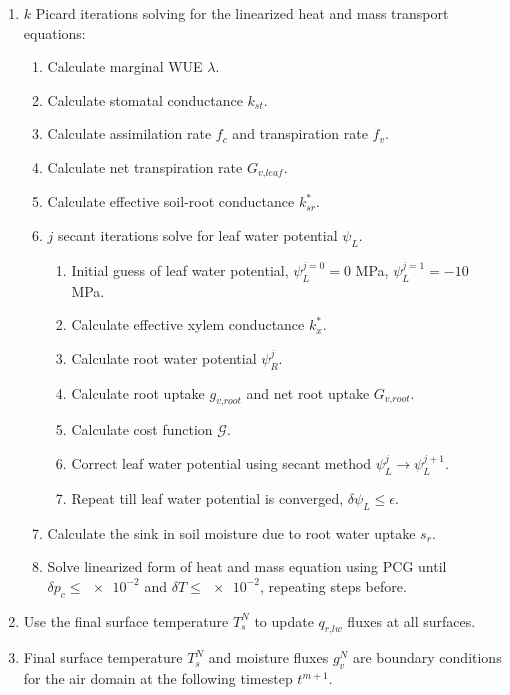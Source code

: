 \begin{enumerate}
	\item $k$ Picard iterations solving for the linearized heat and mass transport equations:
		\begin{enumerate}[label=(\alph*)]
			\item Calculate marginal WUE $\lambda$. %
			\item Calculate stomatal conductance $k_{\textit{st}}$.
			\item Calculate assimilation rate $f_c$ and transpiration rate $f_v$.
			\item Calculate net transpiration rate $G_{\textit{v,leaf}}$.
			\item Calculate effective soil-root conductance $k_{sr}^*$.
			\item $j$ secant iterations solve for leaf water potential $\psi_L$.
				\begin{enumerate}[label=(\alph*)]
					\item Initial guess of leaf water potential, $\psi_L^{j=0} = 0$ MPa, $\psi_L^{j=1} = -10$ MPa.
					\item Calculate effective xylem conductance $k_x^*$.
					\item Calculate root water potential $\psi_R^j$.
					\item Calculate root uptake $g_{\textit{v,root}}$ and net root uptake $G_{\textit{v,root}}$.
					\item Calculate cost function $\mathcal{G}$.
					\item Correct leaf water potential using secant method $\psi_L^{j}\rightarrow\psi_L^{j+1}$.
					\item Repeat till leaf water potential is converged, $\delta \psi_L \le \epsilon$.
				\end{enumerate}
			\item Calculate the sink in soil moisture due to root water uptake $s_{r}$.
			\item Solve linearized form of heat and mass equation using PCG until $\delta p_c \le \num{e-2} $ and $\delta T \le  \num{e-2}$, repeating steps before.
		\end{enumerate}
	\item Use the final surface temperature $T_s^{N}$ to update $q_{\textit{r,lw}}$ fluxes at all surfaces.
	\item Final surface temperature $T_s^N$ and moisture fluxes $g_{v}^N$ are boundary conditions for the air domain at the following timestep $t^{m+1}$.
\end{enumerate}

